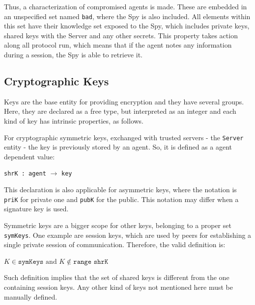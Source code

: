 Thus, a characterization of compromised agents is made. These are embedded in an unspecified set named \texttt{bad}, where the Spy is also included. All elements within this set have their knowledge set exposed to the Spy, which includes private keys, shared keys with the Server and any other secrets. This property takes action along all protocol run, which means that if the agent notes any information during a session, the Spy is able to retrieve it.

\subsection{Cryptographic Keys}
Keys are the base entity for providing encryption and they have several groups. Here, they are declared as a free type, but interpreted as an integer and each kind of key has intrinsic properties, as follows.

For cryptographic symmetric keys, exchanged with trusted servers - the \texttt{Server} entity - the key is previously stored by an agent. So, it is defined as a agent dependent value:

\begin{center}
  \texttt{shrK : agent} $\rightarrow$ \texttt{key}
\end{center}

This declaration is also applicable for asymmetric keys, where the notation is \texttt{priK} for private one and \texttt{pubK} for the public. This notation may differ when a signature key is used.

Symmetric keys are a bigger scope for other keys, belonging to a proper set \texttt{symKeys}. One example are session keys, which are used by peers for establishing a single private session of communication. Therefore, the valid definition is:

\begin{center}
  $K \in \texttt{symKeys} \text{ and } K \notin \texttt{range shrK}$
\end{center}

Such definition implies that the set of shared keys is different from the one containing session keys. Any other kind of keys not mentioned here must be manually defined.






